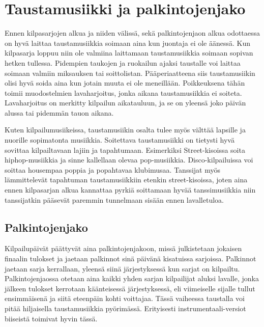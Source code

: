 \documentclass[12pt, a4paper, oneside]{article}
\begin{document}
\section{Taustamusiikki ja palkintojenjako} \label{tausta_musa}

Ennen kilpasarjojen alkua ja niiden välissä,
sekä palkintojenjaon alkua odottaessa on hyvä laittaa taustamusiikkia soimaan aina kun juontaja ei ole äänessä.
Kun kilpasarja loppuu niin ole valmiina laittamaan taustamusiikkia soimaan sopivan hetken tullessa.
Pidempien taukojen ja ruokailun ajaksi taustalle voi laittaa soimaan valmiin miksauksen tai soittolistan.
Pääperiaatteena siis taustamusiikin olisi hyvä soida aina kun jotain muuta ei ole meneillään.
Poikkeuksena tähän toimii muodostelmien lavaharjoitus,
jonka aikana taustamusiikkia ei soiteta.
Lavaharjoitus on merkitty kilpailun aikatauluun,
ja se on yleensä joko päivän alussa tai pidemmän tauon aikana.

Kuten kilpailumusiikeissa,
taustamusiikin osalta tulee myös välttää lapsille ja nuorille sopimatonta musiikkia.
Soitettava taustamusiikki on tietysti hyvä sovittaa kilpailtavaan lajiin ja tapahtumaan.
Esimerkiksi Street-kisoissa soita hiphop-musiikkia ja sinne kallellaan olevaa pop-musiikkia.
Disco-kilpailuissa voi soittaa housempaa poppia ja popahtavaa klubimusaa.
Tanssijat myös lämmittelevät tapahtuman taustamusiikkiin etenkin street-kisoissa,
joten aina ennen kilpasarjan alkua kannattaa pyrkiä soittamaan hyvää tanssimusiikkia niin tanssijatkin pääsevät paremmin tunnelmaan sisään ennen lavalletuloa.

\subsection{Palkintojenjako}

Kilpailupäivät päättyvät aina palkintojenjakoon,
missä julkistetaan jokaisen finaalin tulokset ja jaetaan palkinnot sinä päivänä kisatuissa sarjoissa.
Palkinnot jaetaan sarja kerrallaan,
yleensä siinä järjestyksessä kun sarjat on kilpailtu.
Palkintojenjaossa otetaan aina kaikki yhden sarjan kilpailijat aluksi lavalle,
jonka jälkeen tulokset kerrotaan käänteisessä järjestyksessä,
eli viimeiselle sijalle tullut ensimmäisenä ja siitä eteenpäin kohti voittajaa.
Tässä vaiheessa taustalla voi pitää hiljaisella taustamusiikkia pyörimässä.
Erityisesti instrumentaali-versiot biiseistä toimivat hyvin tässä.
\end{document}
